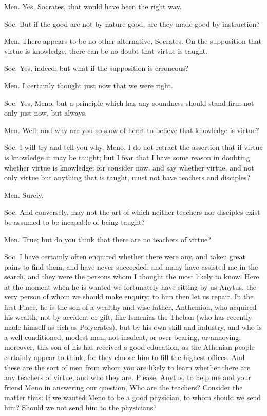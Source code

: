 Men. Yes, Socrates, that would have been the right way. 

Soc. But if the good are not by nature good, are they made good by
instruction? 

Men. There appears to be no other alternative, Socrates. On the supposition
that virtue is knowledge, there can be no doubt that virtue is taught.

Soc. Yes, indeed; but what if the supposition is erroneous?

Men. I certainly thought just now that we were right. 

Soc. Yes, Meno; but a principle which has any soundness should stand
firm not only just now, but always. 

Men. Well; and why are you so slow of heart to believe that knowledge
is virtue? 

Soc. I will try and tell you why, Meno. I do not retract the assertion
that if virtue is knowledge it may be taught; but I fear that I have
some reason in doubting whether virtue is knowledge: for consider
now. and say whether virtue, and not only virtue but anything that
is taught, must not have teachers and disciples? 

Men. Surely. 

Soc. And conversely, may not the art of which neither teachers nor
disciples exist be assumed to be incapable of being taught?

Men. True; but do you think that there are no teachers of virtue?

Soc. I have certainly often enquired whether there were any, and taken
great pains to find them, and have never succeeded; and many have
assisted me in the search, and they were the persons whom I thought
the most likely to know. Here at the moment when he is wanted we fortunately
have sitting by us Anytus, the very person of whom we should make
enquiry; to him then let us repair. In the first Place, he is the
son of a wealthy and wise father, Anthemion, who acquired his wealth,
not by accident or gift, like Ismenias the Theban (who has recently
made himself as rich as Polycrates), but by his own skill and industry,
and who is a well-conditioned, modest man, not insolent, or over-bearing,
or annoying; moreover, this son of his has received a good education,
as the Athenian people certainly appear to think, for they choose
him to fill the highest offices. And these are the sort of men from
whom you are likely to learn whether there are any teachers of virtue,
and who they are. Please, Anytus, to help me and your friend Meno
in answering our question, Who are the teachers? Consider the matter
thus: If we wanted Meno to be a good physician, to whom should we
send him? Should we not send him to the physicians? 

